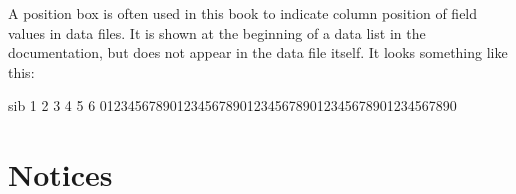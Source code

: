 
\listconventions

A position box is often used in this book to indicate column position
of field values in data files. It is shown at the beginning of a data
list in the documentation, but does not appear in the data file
itself.  It looks something like this:

\begin{vcode}{sib}
1         2         3         4         5         6
012345678901234567890123456789012345678901234567890
\end{vcode}


\W\section{Notices}





